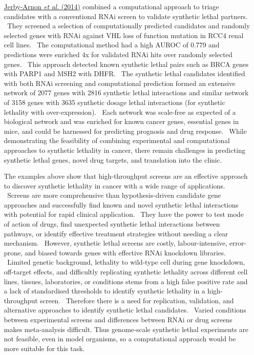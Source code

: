 \hyperlink{ENREF53}{Jerby-Arnon}\hyperlink{ENREF53}{\textit{ et
al.}}\hyperlink{ENREF53}{ (2014)} combined a computational approach to
triage candidates with a conventional RNAi screen to validate synthetic
lethal partners. \ They screened a selection of computationally
predicted candidates and randomly selected genes with RNAi against VHL
loss of function mutation in RCC4 renal cell lines. \ The computational
method had a high AUROC of 0.779 and predictions were enriched 4x for
validated RNAi hits over randomly selected genes. \ This approach
detected known synthetic lethal pairs such as BRCA genes with PARP1 and
MSH2 with DHFR. \ The synthetic lethal candidates identified with both
RNAi screening and computational prediction formed an extensive network
of 2077 genes with 2816 synthetic lethal interactions and similar
network of 3158 genes with 3635 synthetic dosage lethal interactions
(for synthetic lethality with over-expression). \ Each network was
scale-free as expected of a biological network and was enriched for
known cancer genes, essential genes in mice, and could be harnessed for
predicting prognosis and drug response. \ While demonstrating the
feasibility of combining experimental and computational approaches to
synthetic lethality in cancer, there remain challenges in predicting
synthetic lethal genes, novel drug targets, and translation into the
clinic. \ 


The examples above show that high-throughput screens are an effective
approach to discover synthetic lethality in cancer with a wide range of
applications. \ Screens are more comprehensive than hypothesis-driven
candidate gene approaches and successfully find known and novel
synthetic lethal interactions with potential for rapid clinical
application. \ They have the power to test mode of action of drugs,
find unexpected synthetic lethal interactions between pathways, or
identify effective treatment strategies without needing a clear
mechanism. \ However, synthetic lethal screens are costly,
labour-intensive, error-prone, and biased towards genes with effective
RNAi knockdown libraries. \ Limited genetic background, lethality to
wild-type cell during gene knockdown, off-target effects, and
difficultly replicating synthetic lethality across different cell
lines, tissues, laboratories, or conditions stems from a high false
positive rate and a lack of standardised thresholds to identify
synthetic lethality in a high-throughput screen. \ Therefore there is a
need for replication, validation, and alternative approaches to
identify synthetic lethal candidates. \ Varied conditions between
experimental screens and differences between RNAi or drug screens makes
meta-analysis difficult. Thus genome-scale synthetic lethal experiments
are not feasible, even in model organisms, so a computational approach
would be more suitable for this task. \ 


